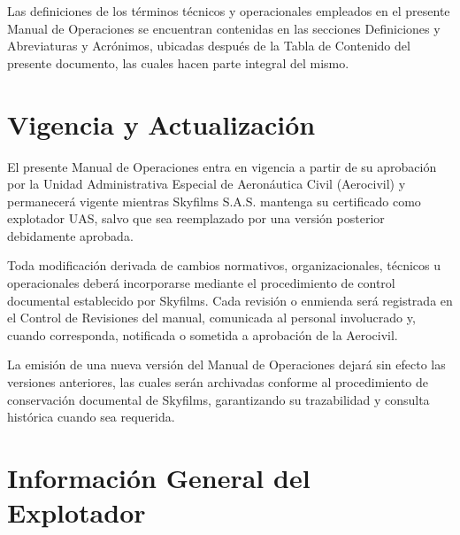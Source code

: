 Las definiciones de los términos técnicos y operacionales empleados en el presente Manual de Operaciones se encuentran contenidas en las secciones Definiciones y Abreviaturas y Acrónimos, ubicadas después de la Tabla de Contenido del presente documento, las cuales hacen parte integral del mismo.




\section{Vigencia y Actualización}

El presente Manual de Operaciones entra en vigencia a partir de su aprobación por la Unidad Administrativa Especial de Aeronáutica Civil (Aerocivil) y permanecerá vigente mientras Skyfilms S.A.S. mantenga su certificado como explotador UAS, salvo que sea reemplazado por una versión posterior debidamente aprobada.

Toda modificación derivada de cambios normativos, organizacionales, técnicos u operacionales deberá incorporarse mediante el procedimiento de control documental establecido por Skyfilms. Cada revisión o enmienda será registrada en el Control de Revisiones del manual, comunicada al personal involucrado y, cuando corresponda, notificada o sometida a aprobación de la Aerocivil.

La emisión de una nueva versión del Manual de Operaciones dejará sin efecto las versiones anteriores, las cuales serán archivadas conforme al procedimiento de conservación documental de Skyfilms, garantizando su trazabilidad y consulta histórica cuando sea requerida.



\section{Información General del Explotador}


